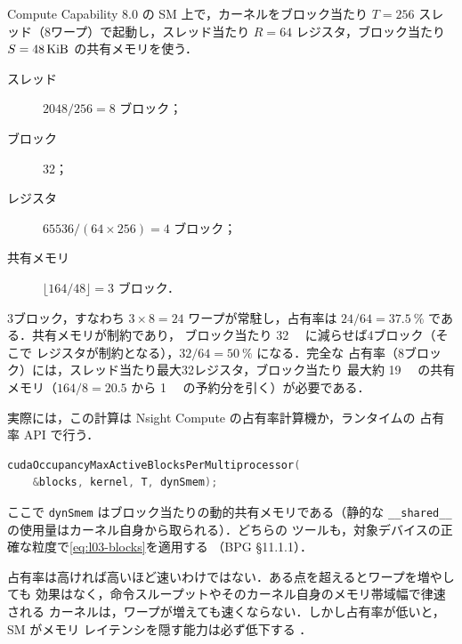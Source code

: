 \documentclass[../main.tex]{subfiles}
\begin{document}
\begin{example}[A100 での占有率]
  \label{ex:l03-occupancy-a100}
  Compute Capability 8.0 の SM 上で，カーネルをブロック当たり
  $T = 256$ スレッド（8ワープ）で起動し，スレッド当たり $R = 64$
  レジスタ，ブロック当たり $S = \SI{48}{\kibi\byte}$ の共有メモリを使う．
  \begin{description}
    \item[スレッド] $2048 / 256 = 8$ ブロック；
    \item[ブロック] 32；
    \item[レジスタ] $\num{65536} / (64 \times 256) = 4$ ブロック；
    \item[共有メモリ] $\lfloor 164 / 48 \rfloor = 3$ ブロック．
  \end{description}
  3ブロック，すなわち $3 \times 8 = 24$ ワープが常駐し，占有率は
  $24 / 64 = \SI{37.5}{\percent}$ である．共有メモリが制約であり，
  ブロック当たり \SI{32}{\kibi\byte} に減らせば4ブロック（そこで
  レジスタが制約となる），$32/64 = \SI{50}{\percent}$ になる．完全な
  占有率（8ブロック）には，スレッド当たり最大32レジスタ，ブロック当たり
  最大約 \SI{19}{\kibi\byte} の共有メモリ（$164/8 = 20.5$ から
  \SI{1}{\kibi\byte} の予約分を引く）が必要である．
\end{example}

実際には，この計算は Nsight Compute の占有率計算機か，ランタイムの
占有率 API で行う．
\begin{lstlisting}[language=C++, numbers=none]
cudaOccupancyMaxActiveBlocksPerMultiprocessor(
    &blocks, kernel, T, dynSmem);
\end{lstlisting}
ここで \texttt{dynSmem} はブロック当たりの動的共有メモリである（静的な
\texttt{\_\_shared\_\_} の使用量はカーネル自身から取られる）．どちらの
ツールも，対象デバイスの正確な粒度で\cref{eq:l03-blocks}を適用する
（BPG §11.1.1）．

占有率は高ければ高いほど速いわけではない．ある点を超えるとワープを増やしても
効果はなく，命令スループットやそのカーネル自身のメモリ帯域幅で律速される
カーネルは，ワープが増えても速くならない．しかし占有率が低いと，SM がメモリ
レイテンシを隠す能力は必ず低下する \cite[§11.1]{nvidia2026cudabestpractices}．
\end{document}
